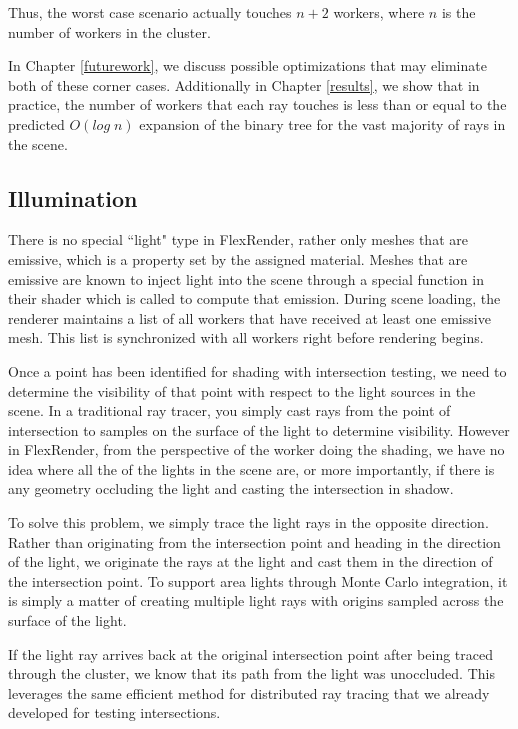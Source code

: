 \documentclass[12pt]{ucthesis}
\begin{document}
Thus, the worst case scenario actually touches $n + 2$ workers, where $n$ is the
number of workers in the cluster.

In Chapter \ref{futurework}, we discuss possible optimizations that may eliminate
both of these corner cases. Additionally in Chapter \ref{results}, we show that
in practice, the number of workers that each ray touches is less than or equal
to the predicted $O(log\;n)$ expansion of the binary tree for the vast majority
of rays in the scene.

\subsection{Illumination}
\label{illumination}

There is no special ``light" type in FlexRender, rather only meshes that are
emissive, which is a property set by the assigned material. Meshes that are
emissive are known to inject light into the scene through a special function in
their shader which is called to compute that emission. During scene loading,
the renderer maintains a list of all workers that have received at least one
emissive mesh. This list is synchronized with all workers right before
rendering begins.

Once a point has been identified for shading with intersection testing, we
need to determine the visibility of that point with respect to the light sources
in the scene. In a traditional ray tracer, you simply cast rays from the point
of intersection to samples on the surface of the light to determine visibility.
However in FlexRender, from the perspective of the worker doing the shading,
we have no idea where all the of the lights in the scene are, or more importantly,
if there is any geometry occluding the light and casting the intersection in
shadow.

To solve this problem, we simply trace the light rays in the opposite direction.
Rather than originating from the intersection point and heading in the
direction of the light, we originate the rays at the light and cast them in the
direction of the intersection point. To support area lights through Monte Carlo
integration, it is simply a matter of creating multiple light rays with origins
sampled across the surface of the light.

If the light ray arrives back at the original intersection point after being
traced through the cluster, we know that its path from the light was unoccluded.
This leverages the same efficient method for distributed ray tracing that we
already developed for testing intersections.
\end{document}
